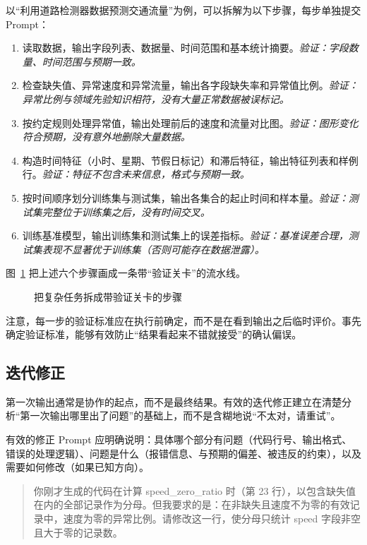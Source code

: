 以“利用道路检测器数据预测交通流量”为例，可以拆解为以下步骤，每步单独提交 Prompt：

\begin{enumerate}
  \item 读取数据，输出字段列表、数据量、时间范围和基本统计摘要。\textit{验证：字段数量、时间范围与预期一致。}
  \item 检查缺失值、异常速度和异常流量，输出各字段缺失率和异常值比例。\textit{验证：异常比例与领域先验知识相符，没有大量正常数据被误标记。}
  \item 按约定规则处理异常值，输出处理前后的速度和流量对比图。\textit{验证：图形变化符合预期，没有意外地删除大量数据。}
  \item 构造时间特征（小时、星期、节假日标记）和滞后特征，输出特征列表和样例行。\textit{验证：特征不包含未来信息，格式与预期一致。}
  \item 按时间顺序划分训练集与测试集，输出各集合的起止时间和样本量。\textit{验证：测试集完整位于训练集之后，没有时间交叉。}
  \item 训练基准模型，输出训练集和测试集上的误差指标。\textit{验证：基准误差合理，测试集表现不显著优于训练集（否则可能存在数据泄露）。}
\end{enumerate}

图~\ref{fig:ch02_decomp} 把上述六个步骤画成一条带“验证关卡”的流水线。

\begin{figure}[H]
  \centering
  \caption{把复杂任务拆成带验证关卡的步骤}
  \label{fig:ch02_decomp}
\end{figure}

注意，每一步的验证标准应在执行前确定，而不是在看到输出之后临时评价。事先确定验证标准，能够有效防止“结果看起来不错就接受”的确认偏误。

\subsection{迭代修正}

第一次输出通常是协作的起点，而不是最终结果。有效的迭代修正建立在清楚分析“第一次输出哪里出了问题”的基础上，而不是含糊地说“不太对，请重试”。

有效的修正 Prompt 应明确说明：具体哪个部分有问题（代码行号、输出格式、错误的处理逻辑）、问题是什么（报错信息、与预期的偏差、被违反的约束），以及需要如何修改（如果已知方向）。

\begin{quote}
你刚才生成的代码在计算 speed\_zero\_ratio 时（第 23 行），以包含缺失值在内的全部记录作为分母。但我要求的是：在非缺失且速度不为零的有效记录中，速度为零的异常比例。请修改这一行，使分母只统计 speed 字段非空且大于零的记录数。
\end{quote}


